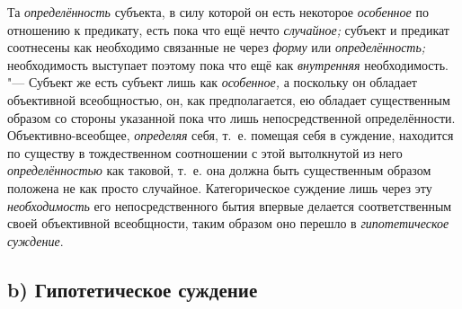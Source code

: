 Та {\em определённость} субъекта, в силу которой он есть некоторое
{\em особенное} по отношению к предикату, есть пока что ещё нечто
{\em случайное;} субъект и предикат соотнесены как необходимо связанные
не через {\em форму} или {\em определённость;}
необходимость выступает поэтому пока что ещё как
{\em внутренняя} необходимость. "--- Субъект же есть субъект лишь
как {\em особенное,} а поскольку он обладает объективной всеобщностью,
он, как предполагается, ею
обладает существенным образом со стороны указанной пока что лишь
непосредственной определённости. Объективно-всеобщее, {\em определяя} себя,
т.~е. помещая себя в суждение, находится по существу в тождественном
соотношении с этой вытолкнутой из него {\em определённостью} как
таковой, т.~е. она должна быть существенным образом положена не как просто
случайное. Категорическое суждение лишь через эту {\em необходимость} его
непосредственного бытия впервые делается соответственным своей объективной
всеобщности, таким образом оно перешло в {\em гипотетическое суждение}.

\subsection[b) Гипотетическое суждение]{b) Гипотетическое суждение}

